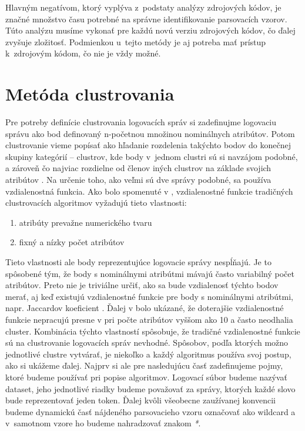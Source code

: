 Hlavným negatívom, ktorý vyplýva z~podstaty analýzy zdrojových kódov, je značné množstvo času potrebné na správne identifikovanie parsovacích vzorov. Túto analýzu musíme vykonať pre každú novú verziu zdrojových kódov, čo ďalej zvyšuje zložitosť. Podmienkou u~tejto metódy je aj potreba mať prístup k~zdrojovým kódom, čo nie je vždy možné. 

\section{ Metóda clustrovania}
Pre potreby definície clustrovania logovacích správ si zadefinujme logovaciu správu ako bod definovaný n-početnou množinou nominálnych atribútov. Potom clustrovanie vieme popísať ako hľadanie rozdelenia takýchto bodov do konečnej skupiny kategórií -- clustrov, kde body v~jednom clustri sú si navzájom podobné, a zároveň čo najviac rozdielne od členov iných clustrov na základe svojich atribútov \parencite{iplom}. Na určenie toho, ako veľmi sú dve správy podobné, sa používa vzdialenostná funkcia. Ako bolo spomenuté v \parencite{logcluster}, vzdialenostné funkcie tradičných clustrovacích algoritmov vyžadujú tieto vlastnosti: 

\begin{enumerate}
  \item atribúty prevažne numerického tvaru
  \item fixný a nízky počet atribútov
\end{enumerate}

Tieto vlastnosti ale body reprezentujúce logovacie správy nespĺňajú. Je to spôsobené tým, že body s nominálnymi atribútmi mávajú často variabilný počet atribútov. Preto nie je triviálne určiť, ako sa bude vzdialenosť týchto bodov merať, aj keď existujú vzdialenostné funkcie pre body s nominálnymi atribútmi, napr. Jaccardov koeficient \parencite{slct}. Ďalej v \parencite{logcluster} bolo ukázané, že doterajšie vzdialenostné funkcie nepracujú presne v pri počte atribútov vyššom ako 10 a často neodhalia cluster. Kombinácia týchto vlastností spôsobuje, že tradičné vzdialenostné funkcie sú na clustrovanie logovacích správ nevhodné. Spôsobov, podľa ktorých možno jednotlivé clustre vytvárať, je niekoľko a každý algoritmus používa svoj postup, ako si ukážeme ďalej. Najprv si ale pre nasledujúcu časť zadefinujeme pojmy, ktoré budeme používať pri popise algoritmov. Logovací súbor budeme nazývať dataset, jeho jednotlivé riadky budeme považovať za správy, ktorých každé slovo bude reprezentovať jeden token. Ďalej kvôli všeobecne zaužívanej konvencii budeme dynamickú časť nájdeného parsovacieho vzoru označovať ako wildcard a v~samotnom vzore ho budeme nahradzovať znakom \emph{*}. 


